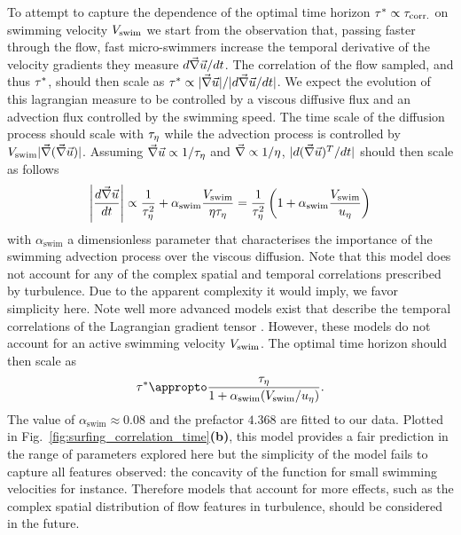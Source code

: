 To attempt to capture the dependence of the optimal time horizon $\TimeHorizonOpt \propto \CorrelationTime$ on swimming velocity $\SwimmingVelocity$ we start from the observation that, passing faster through the flow, fast micro-swimmers increase the temporal derivative of the velocity gradients they measure $d\Gradients/dt$.
The correlation of the flow sampled, and thus $\TimeHorizonOpt$, should then scale as $\TimeHorizonOpt \propto \norm{\Gradients} / \norm{d\Gradients/dt}$.
We expect the evolution of this lagrangian measure to be controlled by a viscous diffusive flux and an advection flux controlled by the swimming speed.
The time scale of the diffusion process should scale with $\KolmogorovTimeScale$ while the advection process is controlled by $\SwimmingVelocity \norm{ \vec{\nabla} (\Gradients) }$.
Assuming $\Gradients \propto 1/\KolmogorovTimeScale$ and $\vec{\nabla} \propto 1/\KolmogorovScale$, $\norm{d(\Gradients)^T/dt}$ should then scale as follows 
\begin{equation}
	\norm*{\frac{d\Gradients}{dt}} \propto \frac{1}{\KolmogorovTimeScale^2} + \alpha_{\mathrm{swim}} \frac{\SwimmingVelocity}{\KolmogorovScale \KolmogorovTimeScale} = \frac{1}{\KolmogorovTimeScale^2} \left(1 + \alpha_{\mathrm{swim}} \frac{\SwimmingVelocity}{\KolmogorovVelocityScale} \right)
\end{equation}
with $\alpha_{\mathrm{swim}}$ a dimensionless parameter that characterises the importance of the swimming advection process over the viscous diffusion.
Note that this model does not account for any of the complex spatial and temporal correlations prescribed by turbulence.
Due to the apparent complexity it would imply, we favor simplicity here. 
Note well more advanced models exist that describe the temporal correlations of the Lagrangian gradient tensor \citep{fang2015short, yu2010lagrangian, chevillard2011lagrangian}. 
However, these models do not account for an active swimming velocity $\SwimmingVelocity$.
The optimal time horizon should then scale as 
\begin{equation}\label{eq:time_horizon_model}
	\TimeHorizonOpt \appropto \frac{\KolmogorovTimeScale}{1 + \alpha_{\mathrm{swim}} (\SwimmingVelocity / \KolmogorovVelocityScale)}.
\end{equation}
The value of $\alpha_{\mathrm{swim}} \approx 0.08$ and the prefactor $4.368$ are fitted to our data.
Plotted in Fig.~\ref{fig:surfing_correlation_time}\textbf{(b)}, this model provides a fair prediction in the range of parameters explored here but the simplicity of the model fails to capture all features observed: the concavity of the function for small swimming velocities for instance.
Therefore models that account for more effects, such as the complex spatial distribution of flow features in turbulence, should be considered in the future.

